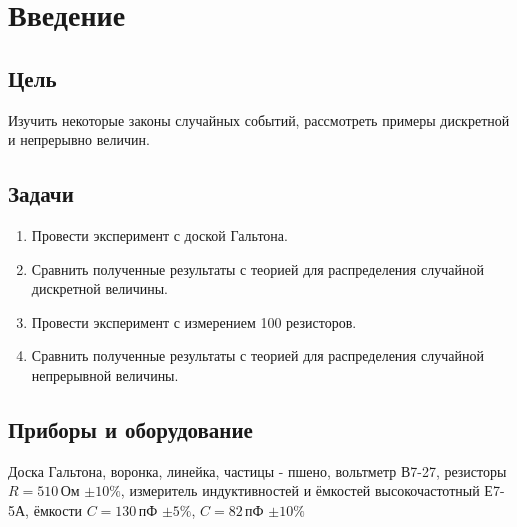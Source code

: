 \section{Введение}
\subsection{Цель}

Изучить некоторые законы случайных событий, рассмотреть примеры дискретной и непрерывно	величин. 
\subsection{Задачи}
\begin{enumerate}
	\item Провести эксперимент с доской Гальтона.
	
	\item Сравнить полученные результаты с теорией для распределения случайной дискретной величины. 
	
	\item Провести эксперимент с измерением 100 резисторов.
	
	\item  Сравнить полученные результаты с теорией для распределения случайной непрерывной величины.
	
\end{enumerate}
\subsection{Приборы и оборудование}
Доска Гальтона, воронка, линейка, частицы - пшено, вольтметр В7-27, резисторы $R = 510\,$Ом $\pm10\%$, измеритель индуктивностей и ёмкостей высокочастотный Е7-5А, ёмкости $ C = 130\,$пФ $\pm5\%$, $C = 82\,$пФ $\pm10\%$
